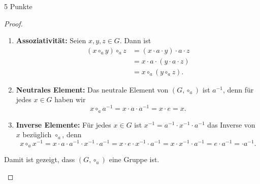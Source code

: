 \documentclass{../problemset}
\begin{document}
\begin{problem} {5 Punkte}
\begin{proof}
\begin{enumerate}
\begin{enumerate}
			      \item \textbf{Assoziativität:} Seien $x, y, z \in G$. Dann ist
			            \begin{align*}
				            (x \circ_a y) \circ_a z & = (x \cdot a \cdot y) \cdot a \cdot z \\
				                                    & = x \cdot a \cdot (y \cdot a \cdot z) \\
				                                    & = x \circ_a (y \circ_a z).
			            \end{align*}

			      \item \textbf{Neutrales Element:} Das neutrale Element von $(G, \circ_a)$ ist $a^{-1}$, denn für jedes $x \in G$ haben wir
			            \[ x \circ_a a^{-1} = x \cdot a \cdot a^{-1} = x \cdot e = x. \]

			      \item \textbf{Inverse Elemente:} Für jedes $x \in G$ ist $x^{-1} = a^{-1} \cdot x^{-1} \cdot a^{-1}$ das Inverse von $x$ bezüglich $\circ_a$, denn
			            \[ x \circ_a x^{-1} = x \cdot a \cdot a^{-1} \cdot x^{-1} \cdot a^{-1} = x \cdot e \cdot x^{-1} \cdot a^{-1} =  x \cdot  x^{-1} \cdot a^{-1} = e \cdot a^{-1} = \cdot a^{-1}. \]

		      \end{enumerate}
		      Damit ist gezeigt, dass $(G, \circ_a)$ eine Gruppe ist. \checkmark
	\end{enumerate}
\end{proof}
\end{problem}
\end{document}
